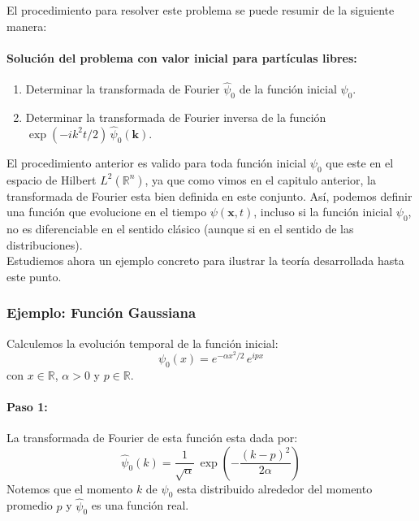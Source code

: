 \documentclass[12pt]{book}
\numberwithin{equation}{chapter}
\def\R{\mathbb{R}}
\def\x{\mathbf{x}}
\def\k{\mathbf{k}}
\begin{document}
El procedimiento para resolver este problema se puede resumir de la siguiente manera:

\paragraph{Soluci\'on del problema con valor inicial para part\'iculas libres:} 
\begin{enumerate}
\item Determinar la transformada de Fourier $\hat{\psi}_{0}$ de la funci\'on inicial $\psi_{0}$.
\item Determinar la transformada de Fourier inversa de la funci\'on $ \exp(-ik^{2}t/2)\, \hat{\psi}_{0}(\k) $. 
\end{enumerate}
\rightline{$\dag$}
\vspace{5 mm}

El procedimiento anterior es valido para toda funci\'on inicial $\psi_{0}$ que este en el espacio de Hilbert $L^{2}(\R^{n})$, ya que como vimos en el capitulo anterior, la transformada de Fourier esta bien definida en este conjunto. As\'i, podemos definir una funci\'on que evolucione en el tiempo $\psi(\x,t)$, incluso si la funci\'on inicial $\psi_{0}$, no es diferenciable en el sentido cl\'asico (aunque si en el sentido de las distribuciones).\\

Estudiemos ahora un ejemplo concreto para ilustrar la teor\'ia desarrollada hasta este punto.\\

\subsubsection{Ejemplo: Funci\'on Gaussiana}
Calculemos la evoluci\'on temporal de la funci\'on inicial:
\begin{equation}
\psi_{0}(x)= e^{-\alpha x^{2}/2}\, e^{ipx}
\end{equation}
con $x\in \R$, $\alpha >0$ y $p \in \R$. 

\paragraph{Paso 1:} La transformada de Fourier de esta funci\'on esta dada por:
\begin{equation}
\hat{\psi}_{0}(k)= \frac{1}{\sqrt{\alpha}}\, \exp \left( - \frac{(k-p)^{2}}{2\alpha}  \right)
\end{equation}
Notemos que el momento $k$ de $\psi_{0}$ esta distribuido alrededor del momento promedio $p$ y $\hat{\psi}_{0}$ es una funci\'on real. 
\end{document}
